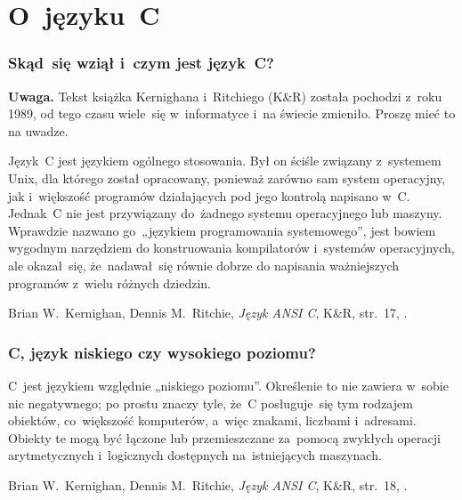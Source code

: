 \documentclass[10pt,t]{beamer}
\begin{document}
\section{O~języku~C}



\begin{frame}
  \frametitle{Skąd~się wziął i~czym jest język~C?}


  \textbf{Uwaga.} Tekst książka Kernighana i~Ritchiego (K\&R) została
  pochodzi z~roku 1989, od tego czasu wiele~się w~informatyce i~na świecie
  zmieniło. Proszę mieć to na uwadze.

  \vspace{1em}





  Język~C jest językiem ogólnego stosowania. Był on ściśle związany
  z~systemem Unix, dla którego został opracowany, ponieważ zarówno sam
  system operacyjny, jak i~większość programów działających pod jego
  kontrolą napisano w~C. Jednak~C nie jest przywiązany do~żadnego
  systemu operacyjnego lub maszyny. Wprawdzie nazwano go~„językiem
  programowania systemowego”, jest bowiem wygodnym narzędziem do
  konstruowania kompilatorów i~systemów operacyjnych, ale okazał~się,
  że~nadawał~się równie dobrze do napisania ważniejszych programów
  z~wielu różnych dziedzin.

  Brian W.~Kernighan, Dennis M.~Ritchie, \textit{Język ANSI C}, K\&R,
  str.~17, \parencite{Kernighan-Ritchie-Jezyk-ANSI-C-Pub-2004}.


\end{frame}





\begin{frame}
  \frametitle{C, język niskiego czy wysokiego poziomu?}


  C~jest językiem względnie „niskiego poziomu”. Określenie to nie zawiera
  w~sobie nic negatywnego; po prostu znaczy tyle, że~C posługuje~się tym
  rodzajem obiektów, co~większość komputerów, a~więc znakami, liczbami
  i~adresami. Obiekty te mogą być łączone lub przemieszczane za~pomocą
  zwykłych operacji arytmetycznych i~logicznych dostępnych na~istniejących
  maszynach.

  Brian W.~Kernighan, Dennis M.~Ritchie, \textit{Język ANSI C}, K\&R,
  str.~18, \parencite{Kernighan-Ritchie-Jezyk-ANSI-C-Pub-2004}.

\end{frame}
\end{document}

